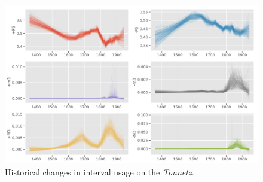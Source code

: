 \begin{frame}
      \begin{figure}
        \centering
        \includegraphics[width=.65\textwidth]{img/bootstrapped_weights.pdf}
        \caption{Historical changes in interval usage on the \emph{Tonnetz}.}
        \label{}
      \end{figure}
\end{frame}


